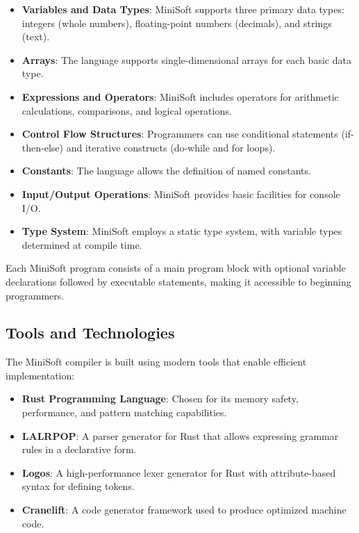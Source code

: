 \documentclass[12pt,a4paper]{article}
\begin{document}
\begin{itemize}
	\item \textbf{Variables and Data Types}: MiniSoft supports three primary data types: integers (whole numbers), floating-point numbers (decimals), and strings (text).

	\item \textbf{Arrays}: The language supports single-dimensional arrays for each basic data type.

	\item \textbf{Expressions and Operators}: MiniSoft includes operators for arithmetic calculations, comparisons, and logical operations.

	\item \textbf{Control Flow Structures}: Programmers can use conditional statements (if-then-else) and iterative constructs (do-while and for loops).

	\item \textbf{Constants}: The language allows the definition of named constants.

	\item \textbf{Input/Output Operations}: MiniSoft provides basic facilities for console I/O.

	\item \textbf{Type System}: MiniSoft employs a static type system, with variable types determined at compile time.
\end{itemize}

Each MiniSoft program consists of a main program block with optional variable declarations followed by executable statements, making it accessible to beginning programmers.

\subsection{Tools and Technologies}
The MiniSoft compiler is built using modern tools that enable efficient implementation:

\begin{itemize}
	\item \textbf{Rust Programming Language}: Chosen for its memory safety, performance, and pattern matching capabilities.

	\item \textbf{LALRPOP}: A parser generator for Rust that allows expressing grammar rules in a declarative form.

	\item \textbf{Logos}: A high-performance lexer generator for Rust with attribute-based syntax for defining tokens.

	\item \textbf{Cranelift}: A code generator framework used to produce optimized machine code.
\end{itemize}
\end{document}

